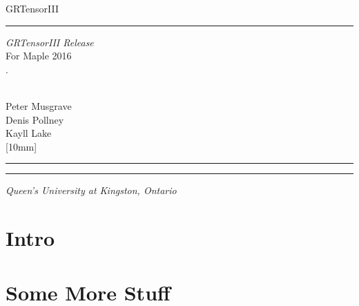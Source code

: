 \documentclass{article}
\newcommand{\grtitle}{\renewcommand\grtitle}
\newcommand{\grdate}{\renewcommand\grdate}
\newcommand{\grlabel}{\renewcommand\grlabel}
\newlength{\grlabelwidth}
\newlength{\grtitlewidth}
\begin{document}
\thispagestyle{empty}
\oddsidemargin  -10pt
\evensidemargin -10pt
\marginparwidth 50pt 
\marginparsep 5pt
\topmargin 0pt
\textheight  7.9in
\textwidth 5.85in
\hoffset=0.65in
%
%
\setcounter{tocdepth}{1} %
%
  \begin{minipage}[t][.95\textheight][c]{.2\textwidth}
    \begin{sideways}
      \fntest
      GRTensorIII
      \normalsize
    \end{sideways}
    \rule{1mm}{.95\textheight}
  \end{minipage}
\grtitle{\grIntroTitle}
\grlabel{\grIntroLabel}
\begin{minipage}[t][.95\textheight][c]{.6\textwidth}
    \settowidth{\grlabelwidth}{\grlabel.~}
    \setlength{\grtitlewidth}{\textwidth}
    \addtolength{\grtitlewidth}{-\grlabelwidth}
    \Large
    \textit{GRTensorIII Release \grRelease}\\
    \large
    For Maple 2016\\ [40mm]
    \huge
    \grlabel.~\parbox[t]{\grtitlewidth}{\raggedright\grtitle}\\ [20mm]
    \large
    Peter Musgrave\\
    Denis Pollney\\ 
    Kayll Lake\\[10mm]
    \grdate\\ [10mm]
    \rule{\textwidth}{.8pt}
    \normalsize\vspace{-2\baselineskip}
    \tableofcontents
    \rule{\textwidth}{.8pt}
    \vfill
    \large
    \textit{Queen's University at Kingston, Ontario}
\end{minipage}

\section{Intro}

\section{Some More Stuff}
\end{document}
